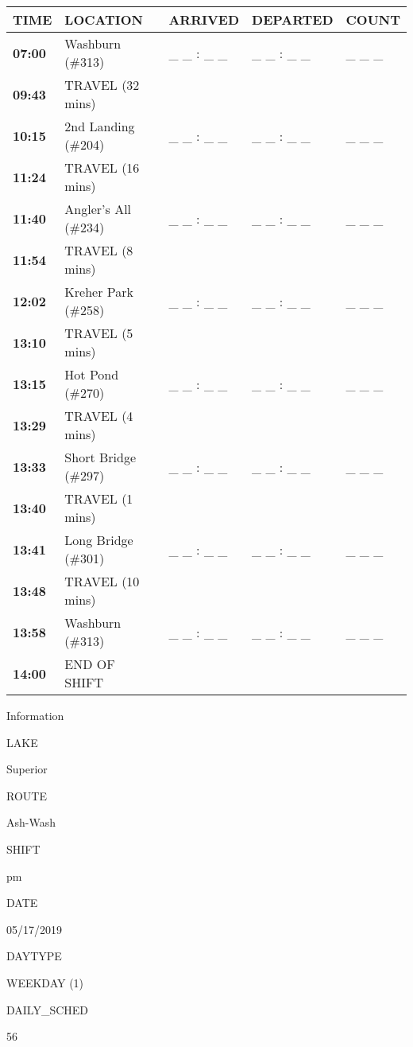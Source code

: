 \documentclass[]{article}
\begin{document}
\begin{tabular}{>{\bfseries}lllll}
\toprule
\textbf{TIME} & \textbf{LOCATION} & \textbf{ARRIVED} & \textbf{DEPARTED} & \textbf{COUNT}\\
\midrule
07:00 & Washburn (\#313) & \_ \_ : \_ \_ & \_ \_ : \_ \_ & \_ \_ \_\\
09:43 & TRAVEL (32 mins) &  &  & \\
10:15 & 2nd Landing (\#204) & \_ \_ : \_ \_ & \_ \_ : \_ \_ & \_ \_ \_\\
11:24 & TRAVEL (16 mins) &  &  & \\
11:40 & Angler's All (\#234) & \_ \_ : \_ \_ & \_ \_ : \_ \_ & \_ \_ \_\\
11:54 & TRAVEL (8 mins) &  &  & \\
12:02 & Kreher Park (\#258) & \_ \_ : \_ \_ & \_ \_ : \_ \_ & \_ \_ \_\\
13:10 & TRAVEL (5 mins) &  &  & \\
13:15 & Hot Pond (\#270) & \_ \_ : \_ \_ & \_ \_ : \_ \_ & \_ \_ \_\\
13:29 & TRAVEL (4 mins) &  &  & \\
13:33 & Short Bridge (\#297) & \_ \_ : \_ \_ & \_ \_ : \_ \_ & \_ \_ \_\\
13:40 & TRAVEL (1 mins) &  &  & \\
13:41 & Long Bridge (\#301) & \_ \_ : \_ \_ & \_ \_ : \_ \_ & \_ \_ \_\\
13:48 & TRAVEL (10 mins) &  &  & \\
13:58 & Washburn (\#313) & \_ \_ : \_ \_ & \_ \_ : \_ \_ & \_ \_ \_\\
14:00 & END OF SHIFT &  &  & \\
\bottomrule
\end{tabular}\newpage

Information

LAKE

Superior

ROUTE

Ash-Wash

SHIFT

pm

DATE

05/17/2019

DAYTYPE

WEEKDAY (1)

DAILY\_SCHED

56

\vspace{24pt}
\end{document}
